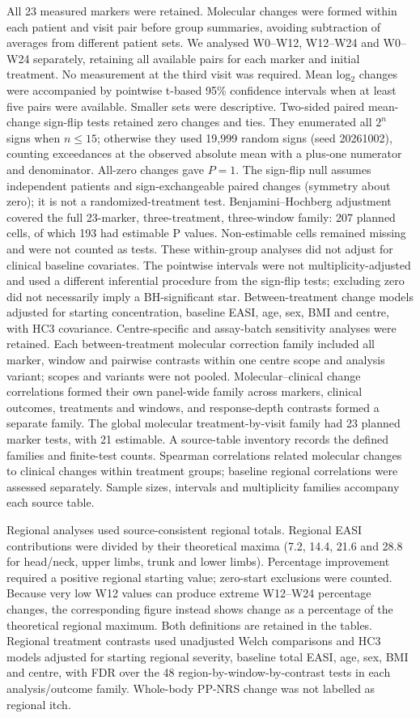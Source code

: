 All 23 measured markers were retained. Molecular changes were formed within each patient and visit pair before group summaries, avoiding subtraction of averages from different patient sets. We analysed W0--W12, W12--W24 and W0--W24 separately, retaining all available pairs for each marker and initial treatment. No measurement at the third visit was required. Mean log$_2$ changes were accompanied by pointwise t-based 95\% confidence intervals when at least five pairs were available. Smaller sets were descriptive. Two-sided paired mean-change sign-flip tests retained zero changes and ties. They enumerated all $2^n$ signs when $n\leq15$; otherwise they used 19,999 random signs (seed 20261002), counting exceedances at the observed absolute mean with a plus-one numerator and denominator. All-zero changes gave $P=1$. The sign-flip null assumes independent patients and sign-exchangeable paired changes (symmetry about zero); it is not a randomized-treatment test. Benjamini--Hochberg adjustment covered the full 23-marker, three-treatment, three-window family: 207 planned cells, of which 193 had estimable P values. Non-estimable cells remained missing and were not counted as tests. These within-group analyses did not adjust for clinical baseline covariates. The pointwise intervals were not multiplicity-adjusted and used a different inferential procedure from the sign-flip tests; excluding zero did not necessarily imply a BH-significant star. Between-treatment change models adjusted for starting concentration, baseline EASI, age, sex, BMI and centre, with HC3 covariance. Centre-specific and assay-batch sensitivity analyses were retained. Each between-treatment molecular correction family included all marker, window and pairwise contrasts within one centre scope and analysis variant; scopes and variants were not pooled. Molecular--clinical change correlations formed their own panel-wide family across markers, clinical outcomes, treatments and windows, and response-depth contrasts formed a separate family. The global molecular treatment-by-visit family had 23 planned marker tests, with 21 estimable. A source-table inventory records the defined families and finite-test counts. Spearman correlations related molecular changes to clinical changes within treatment groups; baseline regional correlations were assessed separately. Sample sizes, intervals and multiplicity families accompany each source table.

Regional analyses used source-consistent regional totals. Regional EASI contributions were divided by their theoretical maxima (7.2, 14.4, 21.6 and 28.8 for head/neck, upper limbs, trunk and lower limbs). Percentage improvement required a positive regional starting value; zero-start exclusions were counted. Because very low W12 values can produce extreme W12--W24 percentage changes, the corresponding figure instead shows change as a percentage of the theoretical regional maximum. Both definitions are retained in the tables. Regional treatment contrasts used unadjusted Welch comparisons and HC3 models adjusted for starting regional severity, baseline total EASI, age, sex, BMI and centre, with FDR over the 48 region-by-window-by-contrast tests in each analysis/outcome family. Whole-body PP-NRS change was not labelled as regional itch.


